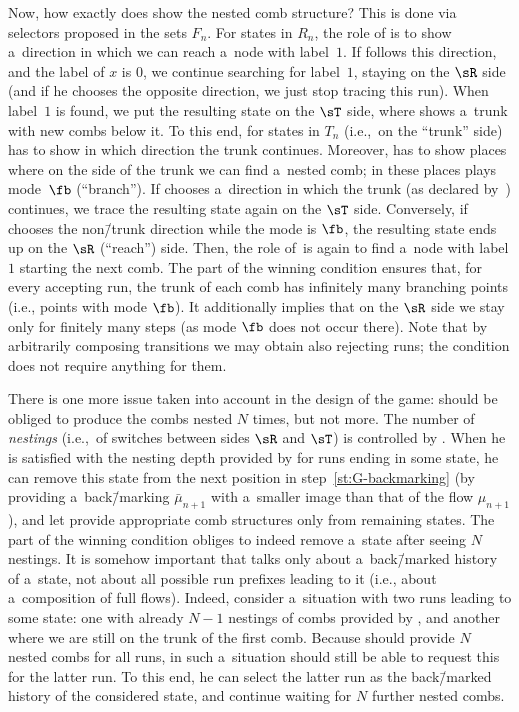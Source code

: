 Now, how exactly does \eve show the nested comb structure?
This is done via selectors proposed in the sets $F_n$.
For states in $R_n$, the role of \eve is to show a~direction in which we can reach a~node with label~$1$.
If \adam follows this direction, and the label of $x$ is $0$, we continue searching for label~$1$, staying on the $\sR$ side
(and if he chooses the opposite direction, we just stop tracing this run).
When label~$1$ is found, we put the resulting state on the $\sT$ side, where \eve shows a~trunk with new combs below it.
To this end, for states in $T_n$ (i.e.,~on the ``trunk'' side) \eve has to show in which direction the trunk continues.
Moreover, \eve has to show places where on the side of the trunk we can find a~nested comb; in these places \eve plays mode~$\fb$ (``branch'').
If \adam chooses a~direction in which the trunk (as declared by~\eve) continues, we trace the resulting state again on the $\sT$ side.
Conversely, if \adam chooses the non\=/trunk direction while the mode is $\fb$, the resulting state ends up on the $\sR$ (``reach'') side.
Then, the role of~\eve is again to find a~node with label $1$ starting the next comb.
The  part of the winning condition ensures that, for every accepting run, the trunk of each comb has infinitely many branching points (i.e., points with mode $\fb$).
It additionally implies that
on the $\sR$ side we stay only for finitely many steps (as mode $\fb$ does not occur there).
Note that by arbitrarily composing transitions we may obtain also rejecting runs; the  condition does not require anything for them.

There is one more issue taken into account in the design of the game: \eve should be obliged to produce the combs nested $N$ times, but not more.
The number of \emph{nestings} (i.e.,~of switches between sides $\sR$ and $\sT$) is controlled by \adam.
When he is satisfied with the nesting depth provided by \eve for runs ending in some state,
he can remove this state from the next position in step~\ref{st:G-backmarking} (by providing a~back\=/marking $\bar\mu_{n+1}$ with a~smaller image than that of the flow $\mu_{n+1}$),
and let \eve provide appropriate comb structures only from remaining states.
The  part of the winning condition obliges \adam to indeed remove a~state after seeing $N$ nestings.
It is somehow important that  talks only about a~back\=/marked history of a~state, not about all possible run prefixes leading to it (i.e., about a~composition of full flows).
Indeed, consider a~situation with two runs leading to some state:
one with already $N{-}1$ nestings of combs provided by \eve, and another where we are still on the trunk of the first comb.
Because \eve should provide $N$ nested combs for all runs, in such a~situation \adam should still be able to request this for the latter run.
To this end, he can select the latter run as the back\=/marked history of the considered state, and continue waiting for $N$ further nested combs.

